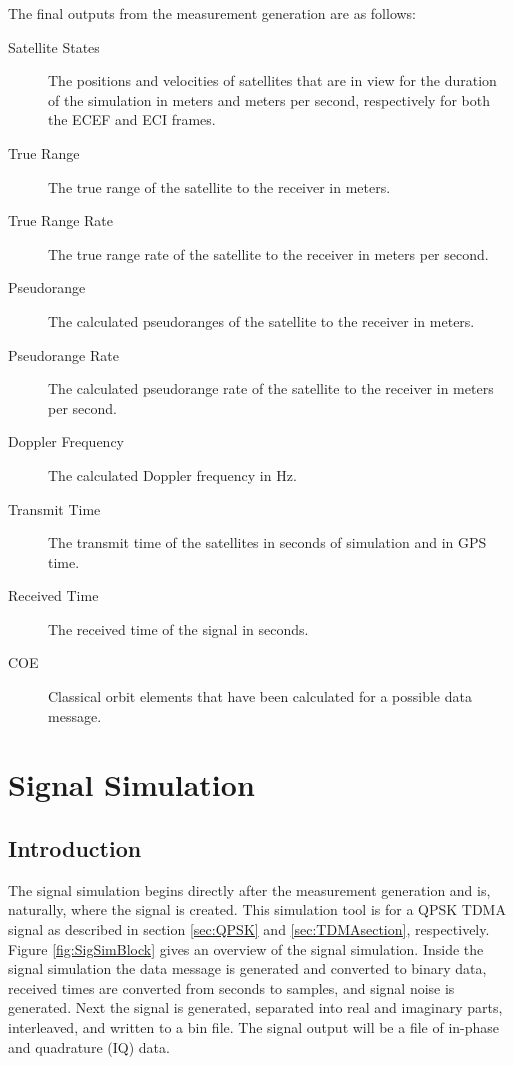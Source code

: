 \documentclass[12pt]{report}
\begin{document}
The final outputs from the measurement generation are as follows:
\begin{description}
    \item[Satellite States] The positions and velocities of satellites that are in view for the duration of the simulation in meters and meters per second, respectively for both the ECEF and ECI frames. 
    \item[True Range] The true range of the satellite to the receiver in meters.
    \item[True Range Rate] The true range rate of the satellite to the receiver in meters per second.
    \item[Pseudorange] The calculated pseudoranges of the satellite to the receiver in meters.
    \item[Pseudorange Rate] The calculated pseudorange rate of the satellite to the receiver in meters per second.
    \item[Doppler Frequency] The calculated Doppler frequency in Hz.
    \item[Transmit Time] The transmit time of the satellites in seconds of simulation and in GPS time.
    \item[Received Time] The received time of the signal in seconds.
    \item[COE] Classical orbit elements that have been calculated for a possible data message.    
\end{description}

\section{Signal Simulation}
\subsection{Introduction}
The signal simulation begins directly after the measurement generation and is, naturally, where the signal is created. This simulation tool is for a QPSK TDMA signal as described in section \ref{sec:QPSK} and \ref{sec:TDMAsection}, respectively. Figure \ref{fig:SigSimBlock} gives an overview of the signal simulation. Inside the signal simulation the data message is generated and converted to binary data, received times are converted from seconds to samples, and signal noise is generated. Next the signal is generated, separated into real and imaginary parts, interleaved, and written to a bin file. The signal output will be a file of in-phase and quadrature (IQ) data.
\end{document}
